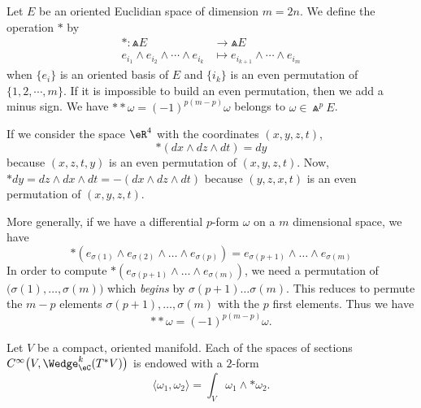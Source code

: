 Let $E$ be an oriented Euclidian space of dimension $m=2n$. We define the operation $*$ by
\begin{equation}		\label{EqGradWedge}
	\begin{aligned}
		*\colon \Wedge E                                & \to \Wedge E                                  \\
		e_{i_1}\wedge e_{i_2}\wedge\cdots\wedge e_{i_k} & \mapsto e_{i_{k+1}}\wedge\cdots\wedge e_{i_m}
	\end{aligned}
\end{equation}
when $\{ e_i \}$ is an oriented basis of $E$ and $\{ i_k \}$ is an even permutation of $\{ 1,2,\cdots,m \}$. If it is impossible to build an even permutation, then we add a minus sign. We have $**\omega=(-1)^{p(m-p)}\omega$ belongs to $\omega\in\Wedge^pE$.

\begin{example}
	If we consider the space $\eR^4$ with the coordinates $(x,y,z,t)$,
	\begin{equation}
		*(dx\wedge dz\wedge dt)=dy
	\end{equation}
	because $(x,z,t,y)$ is an even permutation of $(x,y,z,t)$. Now, $*dy=dz\wedge dx\wedge dt=-(dx\wedge dz\wedge dt)$ because $(y,z,x,t)$ is an even permutation of $(x,y,z,t)$.

	More generally, if we have a differential $p$-form $\omega$ on a $m$ dimensional space, we have
	\begin{equation}
		*(e_{\sigma(1)}\wedge e_{\sigma(2)}\wedge\ldots\wedge e_{\sigma(p)})=e_{\sigma(p+1)}\wedge \ldots\wedge e_{\sigma(m)}
	\end{equation}
	In order to compute $*(e_{\sigma(p+1)}\wedge \ldots\wedge e_{\sigma(m)})$, we need a permutation of $\big( \sigma(1),\ldots, \sigma(m)\big)$ which \emph{begins} by $\sigma(p+1)\ldots\sigma(m)$. This reduces to permute the $m-p$ elements $\sigma(p+1),\ldots,\sigma(m)$ with the $p$ first elements. Thus we have
	\begin{equation}
		**\omega=(-1)^{p(m-p)}\omega.
	\end{equation}
\end{example}

Let $V$ be a compact, oriented manifold. Each of the spaces of sections $ C^{\infty}\big( V, \Wedge^k_{\eC}(T^*V)\big)$ is endowed with a $2$-form
\begin{equation}		\label{EqProdWedgeHOfge}
	\langle \omega_1, \omega_2\rangle =\int_V\omega_1\wedge *\omega_2.
\end{equation}


